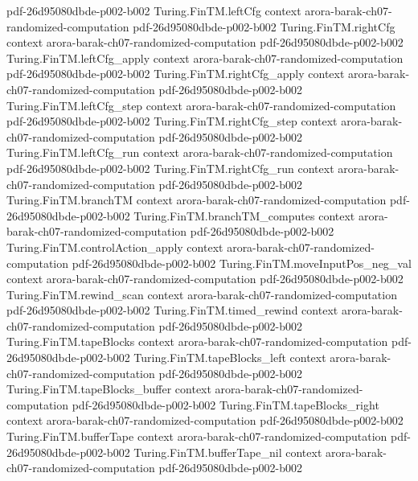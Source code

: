 \begin{theorem}
  {pdf-26d95080dbde-p002-b002}
\proofstep
  {Turing.FinTM.leftCfg}
  {context}
  {arora-barak-ch07-randomized-computation}
  {pdf-26d95080dbde-p002-b002}
\proofstep
  {Turing.FinTM.rightCfg}
  {context}
  {arora-barak-ch07-randomized-computation}
  {pdf-26d95080dbde-p002-b002}
\proofstep
  {Turing.FinTM.leftCfg_apply}
  {context}
  {arora-barak-ch07-randomized-computation}
  {pdf-26d95080dbde-p002-b002}
\proofstep
  {Turing.FinTM.rightCfg_apply}
  {context}
  {arora-barak-ch07-randomized-computation}
  {pdf-26d95080dbde-p002-b002}
\proofstep
  {Turing.FinTM.leftCfg_step}
  {context}
  {arora-barak-ch07-randomized-computation}
  {pdf-26d95080dbde-p002-b002}
\proofstep
  {Turing.FinTM.rightCfg_step}
  {context}
  {arora-barak-ch07-randomized-computation}
  {pdf-26d95080dbde-p002-b002}
\proofstep
  {Turing.FinTM.leftCfg_run}
  {context}
  {arora-barak-ch07-randomized-computation}
  {pdf-26d95080dbde-p002-b002}
\proofstep
  {Turing.FinTM.rightCfg_run}
  {context}
  {arora-barak-ch07-randomized-computation}
  {pdf-26d95080dbde-p002-b002}
\proofstep
  {Turing.FinTM.branchTM}
  {context}
  {arora-barak-ch07-randomized-computation}
  {pdf-26d95080dbde-p002-b002}
\proofstep
  {Turing.FinTM.branchTM_computes}
  {context}
  {arora-barak-ch07-randomized-computation}
  {pdf-26d95080dbde-p002-b002}
\proofstep
  {Turing.FinTM.controlAction_apply}
  {context}
  {arora-barak-ch07-randomized-computation}
  {pdf-26d95080dbde-p002-b002}
\proofstep
  {Turing.FinTM.moveInputPos_neg_val}
  {context}
  {arora-barak-ch07-randomized-computation}
  {pdf-26d95080dbde-p002-b002}
\proofstep
  {Turing.FinTM.rewind_scan}
  {context}
  {arora-barak-ch07-randomized-computation}
  {pdf-26d95080dbde-p002-b002}
\proofstep
  {Turing.FinTM.timed_rewind}
  {context}
  {arora-barak-ch07-randomized-computation}
  {pdf-26d95080dbde-p002-b002}
\proofstep
  {Turing.FinTM.tapeBlocks}
  {context}
  {arora-barak-ch07-randomized-computation}
  {pdf-26d95080dbde-p002-b002}
\proofstep
  {Turing.FinTM.tapeBlocks_left}
  {context}
  {arora-barak-ch07-randomized-computation}
  {pdf-26d95080dbde-p002-b002}
\proofstep
  {Turing.FinTM.tapeBlocks_buffer}
  {context}
  {arora-barak-ch07-randomized-computation}
  {pdf-26d95080dbde-p002-b002}
\proofstep
  {Turing.FinTM.tapeBlocks_right}
  {context}
  {arora-barak-ch07-randomized-computation}
  {pdf-26d95080dbde-p002-b002}
\proofstep
  {Turing.FinTM.bufferTape}
  {context}
  {arora-barak-ch07-randomized-computation}
  {pdf-26d95080dbde-p002-b002}
\proofstep
  {Turing.FinTM.bufferTape_nil}
  {context}
  {arora-barak-ch07-randomized-computation}
  {pdf-26d95080dbde-p002-b002}

\end{theorem}
